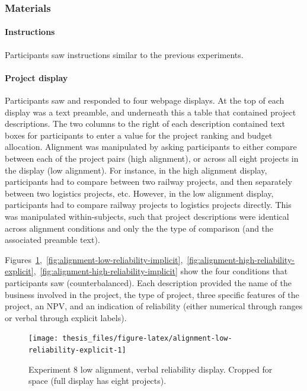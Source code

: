 \documentclass[a4paper, nobind, dvipsnames]{templates/ociamthesis}
\theoremstyle{definition}
\theoremstyle{definition}
\theoremstyle{definition}
\theoremstyle{definition}
\theoremstyle{remark}
\begin{document}
\hypertarget{materials-16}{%
\subsubsection{Materials}\label{materials-16}}

\hypertarget{instructions-9}{%
\paragraph{Instructions}\label{instructions-9}}

Participants saw instructions similar to the previous experiments.

\hypertarget{project-display-2}{%
\paragraph{Project display}\label{project-display-2}}

Participants saw and responded to four webpage displays. At the top of each
display was a text preamble, and underneath this a table that contained project
descriptions. The two columns to the right of each description contained text
boxes for participants to enter a value for the project ranking and budget
allocation. Alignment was manipulated by asking participants to either compare
between each of the project pairs (high alignment), or across all eight projects
in the display (low alignment). For instance, in the high alignment display,
participants had to compare between two railway projects, and then separately
between two logistics projects, etc. However, in the low alignment display,
participants had to compare railway projects to logistics projects directly.
This was manipulated within-subjects, such that project descriptions were
identical across alignment conditions and only the the type of comparison (and
the associated preamble text).

Figures~\ref{fig:alignment-low-reliability-explicit},~\ref{fig:alignment-low-reliability-implicit},~\ref{fig:alignment-high-reliability-explicit},~\ref{fig:alignment-high-reliability-implicit}
show the four conditions that participants saw (counterbalanced). Each
description provided the name of the business involved in the project, the type
of project, three specific features of the project, an NPV, and an indication of
reliability (either numerical through ranges or verbal through explicit labels).

\begin{figure}
\texttt{[image: thesis\_files/figure-latex/alignment-low-reliability-explicit-1]} \caption{Experiment 8 low alignment, verbal reliability display. Cropped for space (full display has eight projects).}\label{fig:alignment-low-reliability-explicit}
\end{figure}
\end{document}
